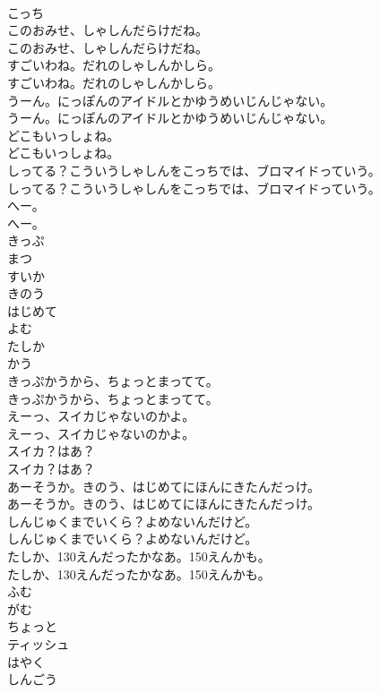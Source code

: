 \documentclass[8pt]{extreport}
\begin{document}
\begin{CJK}{UTF8}{min}
\\	こっち
\\	このおみせ、しゃしんだらけだね。
\\	このおみせ、しゃしんだらけだね。
\\	すごいわね。だれのしゃしんかしら。
\\	すごいわね。だれのしゃしんかしら。
\\	うーん。にっぽんのアイドルとかゆうめいじんじゃない。
\\	うーん。にっぽんのアイドルとかゆうめいじんじゃない。
\\	どこもいっしょね。
\\	どこもいっしょね。
\\	しってる？こういうしゃしんをこっちでは、ブロマイドっていう。
\\	しってる？こういうしゃしんをこっちでは、ブロマイドっていう。
\\	へー。
\\	へー。
\\	きっぷ
\\	まつ
\\	すいか
\\	きのう
\\	はじめて
\\	よむ
\\	たしか
\\	かう
\\	きっぷかうから、ちょっとまってて。
\\	きっぷかうから、ちょっとまってて。
\\	えーっ、スイカじゃないのかよ。
\\	えーっ、スイカじゃないのかよ。
\\	スイカ？はあ？
\\	スイカ？はあ？
\\	あーそうか。きのう、はじめてにほんにきたんだっけ。
\\	あーそうか。きのう、はじめてにほんにきたんだっけ。
\\	しんじゅくまでいくら？よめないんだけど。
\\	しんじゅくまでいくら？よめないんだけど。
\\	たしか、130えんだったかなあ。150えんかも。
\\	たしか、130えんだったかなあ。150えんかも。
\\	ふむ
\\	がむ
\\	ちょっと
\\	ティッシュ
\\	はやく
\\	しんごう

\end{CJK}
\end{document}
